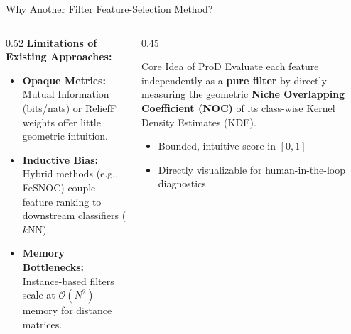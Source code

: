 \begin{frame}{Why Another Filter Feature-Selection Method?}
  \begin{columns}[T]
    \begin{column}{0.52\textwidth}
      \textbf{Limitations of Existing Approaches:}
      \begin{itemize}
        \item \textbf{Opaque Metrics:} Mutual Information (bits/nats) or ReliefF weights offer little geometric intuition.
        \item \textbf{Inductive Bias:} Hybrid methods (e.g., FeSNOC) couple feature ranking to downstream classifiers ($k$NN).
        \item \textbf{Memory Bottlenecks:} Instance-based filters scale at $\mathcal{O}(N^2)$ memory for distance matrices.
      \end{itemize}
    \end{column}
    \begin{column}{0.45\textwidth}
      \begin{block}{Core Idea of ProD}
        Evaluate each feature independently as a \textbf{pure filter} by directly measuring the geometric \textbf{Niche Overlapping Coefficient (NOC)} of its class-wise Kernel Density Estimates (KDE).
      \end{block}
      \vspace{0.3em}
      \begin{itemize}
        \item Bounded, intuitive score in $[0, 1]$
        \item Directly visualizable for human-in-the-loop diagnostics
      \end{itemize}
    \end{column}
  \end{columns}
\end{frame}
